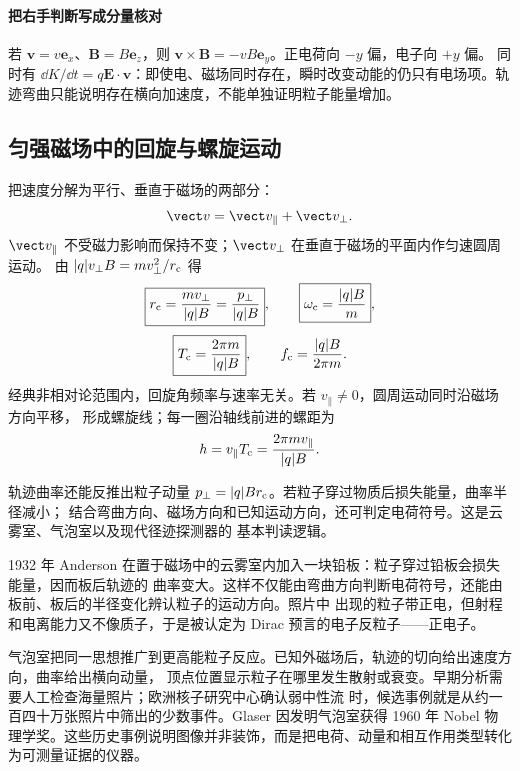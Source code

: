 \paragraph{把右手判断写成分量核对}
若 $\boldsymbol v=v\boldsymbol e_x$、$\boldsymbol B=B\boldsymbol e_z$，则
$\boldsymbol v\times\boldsymbol B=-vB\boldsymbol e_y$。正电荷向 $-y$ 偏，电子向 $+y$ 偏。
同时有 $\dd K/\dd t=q\boldsymbol E\cdot\boldsymbol v$：即使电、磁场同时存在，瞬时改变动能的仍只有电场项。轨迹弯曲只能说明存在横向加速度，不能单独证明粒子能量增加。

\subsection*{匀强磁场中的回旋与螺旋运动}

把速度分解为平行、垂直于磁场的两部分：
\begin{equation}
  \vect v=\vect v_\parallel+\vect v_\perp .
\end{equation}
$\vect v_\parallel$ 不受磁力影响而保持不变；$\vect v_\perp$ 在垂直于磁场的平面内作匀速圆周运动。
由 $|q|v_\perp B=mv_\perp^2/r_{\rm c}$ 得
\begin{equation}
  \boxed{r_{\rm c}=\frac{mv_\perp}{|q|B}=\frac{p_\perp}{|q|B}},
  \qquad
  \boxed{\omega_{\rm c}=\frac{|q|B}{m}},
\end{equation}
\begin{equation}
  \boxed{T_{\rm c}=\frac{2\pi m}{|q|B}},
  \qquad
  f_{\rm c}=\frac{|q|B}{2\pi m}.
\end{equation}
经典非相对论范围内，回旋角频率与速率无关。若 $v_\parallel\ne0$，圆周运动同时沿磁场方向平移，
形成螺旋线；每一圈沿轴线前进的螺距为
\begin{equation}
  h=v_\parallel T_{\rm c}=\frac{2\pi m v_\parallel}{|q|B}.
\end{equation}

\gyroHelixDiagram

轨迹曲率还能反推出粒子动量 $p_\perp=|q|Br_{\rm c}$。若粒子穿过物质后损失能量，曲率半径减小；
结合弯曲方向、磁场方向和已知运动方向，还可判定电荷符号。这是云雾室、气泡室以及现代径迹探测器的
基本判读逻辑。

1932 年 Anderson 在置于磁场中的云雾室内加入一块铅板：粒子穿过铅板会损失能量，因而板后轨迹的
曲率变大。这样不仅能由弯曲方向判断电荷符号，还能由板前、板后的半径变化辨认粒子的运动方向。照片中
出现的粒子带正电，但射程和电离能力又不像质子，于是被认定为 Dirac 预言的电子反粒子——正电子。

气泡室把同一思想推广到更高能粒子反应。已知外磁场后，轨迹的切向给出速度方向，曲率给出横向动量，
顶点位置显示粒子在哪里发生散射或衰变。早期分析需要人工检查海量照片；欧洲核子研究中心确认弱中性流
时，候选事例就是从约一百四十万张照片中筛出的少数事件。Glaser 因发明气泡室获得 1960 年 Nobel
物理学奖。这些历史事例说明图像并非装饰，而是把电荷、动量和相互作用类型转化为可测量证据的仪器。

